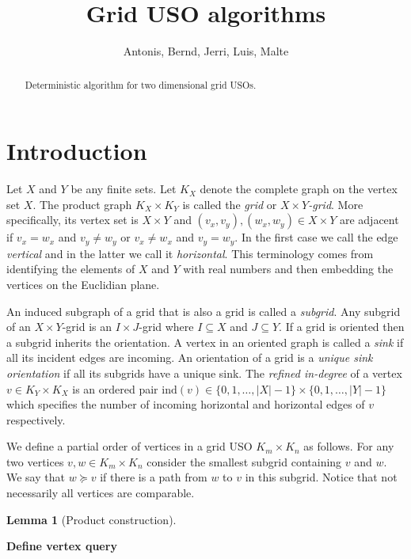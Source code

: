 \documentclass[a4paper,10pt]{article}
\title{Grid USO algorithms}
\author{Antonis, Bernd, Jerri, Luis, Malte}
\newtheorem{lemma}{Lemma}
\newcommand{\indegree}{refined in-degree\xspace}
\newcommand{\ind}{\ensuremath{\mathrm{ind}}}
\begin{document}
\maketitle 

\begin{abstract}
Deterministic algorithm for two dimensional grid USOs.
\end{abstract}

\section{Introduction}

Let $X$ and $Y$ be any finite sets. Let $K_X$ denote the complete graph on the vertex set $X$. The product graph $K_X\times K_Y$ is called the \emph{grid} or \emph{$X\times Y$-grid}. More specifically, its vertex set is $X\times Y$ and $(v_x,v_y),(w_x,w_y) \in X\times Y$ are adjacent if $v_x = w_x$ and $v_y \not= w_y$ or $v_x \not= w_x$ and $v_y = w_y$. In the first case we call the edge \emph{vertical} and in the latter we call it \emph{horizontal}. This terminology comes from identifying the elements of $X$ and $Y$ with real numbers and then embedding the vertices on the Euclidian plane. 

An induced subgraph of a grid that is also a grid is called a \emph{subgrid}. Any subgrid of an $X\times Y$-grid is an $I\times J$-grid where $I \subseteq X$ and $J \subseteq Y$. If a grid is oriented then a subgrid inherits the orientation. A vertex in an oriented graph is called a \emph{sink} if all its incident edges are incoming. An orientation of a grid is a \emph{unique sink orientation} if all its subgrids have a unique sink. The \emph{\indegree} of a vertex $v \in K_{Y} \times K_{X}$ is an ordered pair $\ind (v) \in \{0,1,\ldots,|X|-1\}\times \{0,1,\ldots,|Y|-1\}$ which specifies the number of incoming horizontal and horizontal edges of $v$ respectively. 

We define a partial order of vertices in a grid USO $K_{m} \times K_{n}$ as follows. For any two vertices $v,w \in K_{m} \times K_{n}$ consider the smallest subgrid containing $v$ and $w$. We say that $w \succeq v$ if there is a path from $w$ to $v$ in this subgrid. Notice that not necessarily all vertices are comparable.

\begin{lemma}[Product construction]
 
\end{lemma}


\textbf{Define vertex query}
\end{document}
